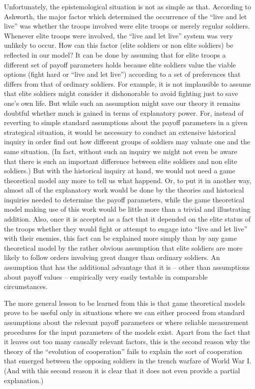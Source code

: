 Unfortunately, the epistemological situation is not as simple as that.
According to Ashworth, the major factor which determined the occurrence of the
``live and let live'' was whether the troops involved were elite troops or
merely regular soldiers.  Whenever elite troops were involved, the ``live and
let live'' system was very unlikely to occur. How can this factor (elite
soldiers or non elite soldiers) be reflected in our model? It can be done by
assuming that for elite troops a different set of payoff parameters holds
because elite soldiers value the viable options (fight hard or ``live and let
live'') according to a set of preferences that differs from that of ordinary
soldiers. For example, it is not implausible to assume that elite soldiers
might consider it dishonorable to avoid fighting just to save one's own life.
But while such an assumption might save our theory it remains doubtful whether
much is gained in terms of explanatory power.  For, instead of reverting to
simple standard assumptions about the payoff parameters in a given strategical
situation, it would be necessary to conduct an extensive historical inquiry in
order find out how different groups of soldiers may valuate one and the same
situation. (In fact, without such an inquiry we might not even be aware that
there is such an important difference between elite soldiers and non elite
soldiers.) But with the historical inquiry at hand, we would not need a game
theoretical model any more to tell us what happend. Or, to put it in another
way, almost all of the explanatory work would be done by the theories and
historical inquiries needed to determine the payoff parameters, while the game
theoretical model making use of this work would be little more than a trivial
and illustrating addition. Also, once it is accepted as a fact that it
depended on the elite status of the troops whether they would fight or attempt
to engage into ``live and let live'' with their enemies, this fact can be
explained more simply than by any game theoretical model by the rather
obvious assumption that elite soldiers are more likely to follow orders
involving great danger than ordinary soldiers. An assumption that has the
additional advantage that it is -- other than assumptions about payoff values
-- empirically very easily testable in comparable circumstances.

The more general lesson to be learned from this is that game theoretical
models prove to be useful only in situations where we can either proceed from
standard assumptions about the relevant payoff parameters or where reliable
measurement procedures for the input parameters of the models exist. Apart
from the fact that it leaves out too many causally relevant factors, this is
the second reason why the theory of the ``evolution of cooperation'' fails to
explain the sort of cooperation that emerged between the opposing soldiers in
the trench warfare of World War I. (And with this second reason it is clear
that it does not even provide a partial explanation.)

